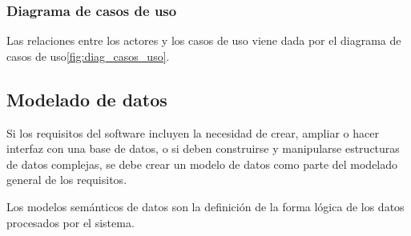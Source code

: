\subsubsection{Diagrama de casos de uso}
Las relaciones entre los actores y los casos de uso viene dada por el diagrama de casos de uso\ref{fig:diag_casos_uso}.


\subsection{Modelado de datos}
Si los requisitos del software incluyen la necesidad de crear, ampliar o hacer interfaz con una base de datos, o si deben construirse y manipularse estructuras de datos complejas, se debe crear un modelo de datos como parte del modelado general de los requisitos.\cite{pressman}


Los modelos semánticos de datos son la definición de la forma lógica de los datos procesados por el sistema. \cite{sommerville}
